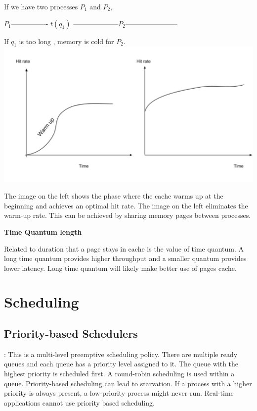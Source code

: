 \documentclass[twoside]{article}
\begin{document}
 If we have two processes $P_1$ and $P_2$, \\
 
\begin{center}
                $P_1$---------------- $t(q_1)$ --------------------$P_2$-----------------------\\
               \end{center}               
If $q_1$ is too long , memory is cold for $P_2$.  \\
\includegraphics[width=\textwidth]{cachehitrate}
 
The image on the left shows the phase where the cache warms up at the beginning and achieves an optimal hit rate. The image on the left eliminates the warm-up rate. This can be achieved by sharing memory pages between processes.  
 
 \textbf{Time Quantum length }
 
Related to duration that a page stays in cache is the value of time quantum. A long time quantum provides higher throughput and a smaller quantum provides lower latency. Long time quantum will likely make better use of pages cache. 
\section{Scheduling}
\subsection{Priority-based Schedulers }: This is a multi-level preemptive scheduling policy. There are multiple ready queues and each queue has a priority level assigned to it. The queue with the highest priority is scheduled first. A round-robin scheduling is used within a queue. 
Priority-based scheduling can lead to starvation. If a process with a higher priority is always present, a low-priority process might never run. Real-time applications cannot use priority based scheduling. 
\end{document}
